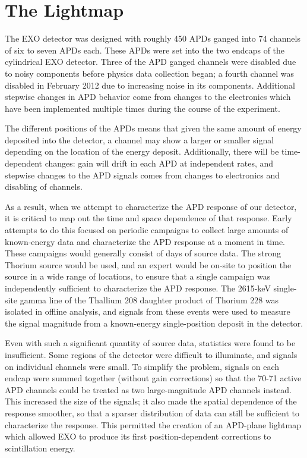 
\renewcommand{\thechapter}{1}
\chapter{The Lightmap}

The EXO detector was designed with roughly 450 APDs ganged into 74 channels of six to seven APDs each.  These APDs were set into the two endcaps of the cylindrical EXO detector.  Three of the APD ganged channels were disabled due to noisy components before physics data collection began; a fourth channel was disabled in February 2012 due to increasing noise in its components.  Additional stepwise changes in APD behavior come from changes to the electronics which have been implemented multiple times during the course of the experiment.

The different positions of the APDs means that given the same amount of energy deposited into the detector, a channel may show a larger or smaller signal depending on the location of the energy deposit.  Additionally, there will be time-dependent changes: gain will drift in each APD at independent rates, and stepwise changes to the APD signals comes from changes to electronics and disabling of channels.

As a result, when we attempt to characterize the APD response of our detector, it is critical to map out the time and space dependence of that response.  Early attempts to do this focused on periodic campaigns to collect large amounts of known-energy data and characterize the APD response at a moment in time.  These campaigns would generally consist of days of source data.  The strong Thorium source would be used, and an expert would be on-site to position the source in a wide range of locations, to ensure that a single campaign was independently sufficient to characterize the APD response.  The 2615-keV single-site gamma line of the Thallium 208 daughter product of Thorium 228 was isolated in offline analysis, and signals from these events were used to measure the signal magnitude from a known-energy single-position deposit in the detector.

Even with such a significant quantity of source data, statistics were found to be insufficient.  Some regions of the detector were difficult to illuminate, and signals on individual channels were small.  To simplify the problem, signals on each endcap were summed together (without gain corrections) so that the 70-71 active APD channels could be treated as two large-magnitude APD channels instead.  This increased the size of the signals; it also made the spatial dependence of the response smoother, so that a sparser distribution of data can still be sufficient to characterize the response.  This permitted the creation of an APD-plane lightmap which allowed EXO to produce its first position-dependent corrections to scintillation energy.

